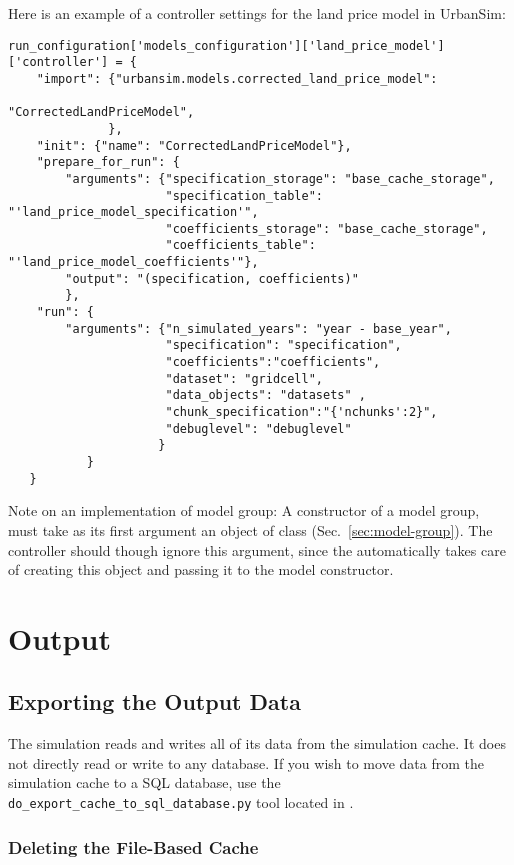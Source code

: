 Here is an example of a controller settings for the land price model in UrbanSim:
\modelsindex\datasetindex
\begin{verbatim}
run_configuration['models_configuration']['land_price_model']['controller'] = {
    "import": {"urbansim.models.corrected_land_price_model":
                                                "CorrectedLandPriceModel",
              },
    "init": {"name": "CorrectedLandPriceModel"},
    "prepare_for_run": {
        "arguments": {"specification_storage": "base_cache_storage",
                      "specification_table": "'land_price_model_specification'",
                      "coefficients_storage": "base_cache_storage",
                      "coefficients_table": "'land_price_model_coefficients'"},
        "output": "(specification, coefficients)"
        },
    "run": {
        "arguments": {"n_simulated_years": "year - base_year",
                      "specification": "specification",
                      "coefficients":"coefficients",
                      "dataset": "gridcell",
                      "data_objects": "datasets" ,
                      "chunk_specification":"{'nchunks':2}",
                      "debuglevel": "debuglevel"
                     }
           }
   }
\end{verbatim}
Note on an implementation of model group: A constructor of 
a model group, must take as its first argument an object of class  (Sec.~\ref{sec:model-group}). 
The controller should though ignore this argument, since the  automatically takes care of creating this object 
and passing it to the model constructor.

\section{Output}
%
\subsection{Exporting the Output Data}

The simulation reads and writes all of its data from the simulation cache.  It 
does not directly read or write to any database. 
If you wish to move data from the simulation cache to a SQL database, use the
\verb|do_export_cache_to_sql_database.py| tool located in
. 


\subsubsection{Deleting the File-Based Cache}

